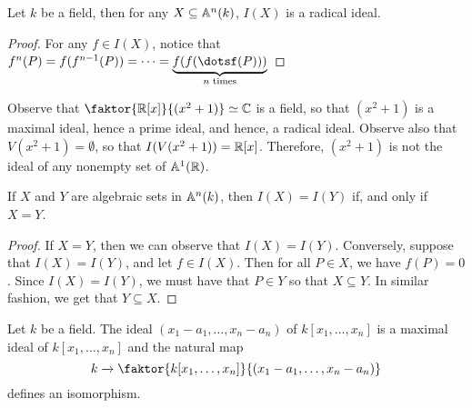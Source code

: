 \begin{lemma}\label{1.3.5}
    Let $k$ be a field, then for any $X \subseteq \mathbb{A}^n(k)$, $I(X)$ is a radical
    ideal.
\end{lemma}
\begin{proof}
    For any $f \in I(X)$, notice that $f^n(P)=f(f^{n-1}(P))=\dots=
    \underbrace{f(f(\dotsf(P)))}_{n\text{ times}}$
\end{proof}

\begin{example}\label{example_3.5}
    Observe that $\faktor{\R[x]}{(x^2+1)} \simeq \C$ is a field, so that
    $(x^2+1)$ is a maximal ideal, hence a prime ideal, and hence, a radical
    ideal. Observe also that $V(x^2+1)=\emptyset$, so that $I(V(x^2+1))=\mathbb{R}[x]$.
    Therefore, $(x^2+1)$ is not the ideal of any nonempty set of $\mathbb{A}^1(\mathbb{R})$.
\end{example}

\begin{lemma}\label{1.3.6}
    If $X$ and $Y$ are algebraic sets in $\mathbb{A}^n(k)$, then $I(X)=I(Y)$ if, and
    only if $X=Y$.
\end{lemma}
\begin{proof}
    If $X=Y$, then we can observe that $I(X)=I(Y)$. Conversely, suppose that
    $I(X)=I(Y)$, and let $f \in I(X)$. Then for all $P \in X$, we have $f(P)=0$.
    Since $I(X)=I(Y)$, we must have that $P \in Y$ so that $X \subseteq Y$. In
    similar fashion, we get that $Y \subseteq X$.
\end{proof}

\begin{theorem}\label{1.3.7}
    Let $k$ be a field. The ideal $(x_1-a_1, \dots, x_n-a_n)$ of
    $k[x_1, \dots, x_n]$ is a maximal ideal of $k[x_1, \dots, x_n]$ and the
    natural map
    \begin{equation*}
        k \xrightarrow{} \faktor{k[x_1, \dots, x_n]}{(x_1-a_1, \dots, x_n-a_n)}
    \end{equation*}
    defines an isomorphism.
\end{theorem}
